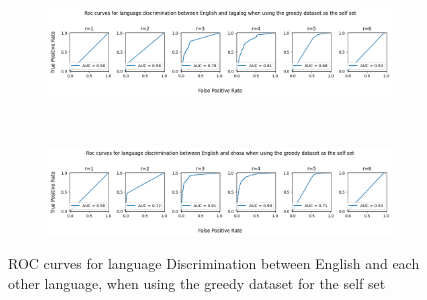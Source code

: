 \documentclass{article}
\begin{document}
\begin{figure}[ht]
\begin{subfigure}[t]{\linewidth}
        \label{fig:eng_mid_pla_grd}
    \end{subfigure}
    \\
    \begin{subfigure}[t]{\linewidth}
        \centering
        \includegraphics[width=\linewidth]{images/english_tagalog_greedy.png}
        \label{fig:eng_mid_tag_grd}
    \end{subfigure}
        \\
    \begin{subfigure}[t]{\linewidth}
        \centering
        \includegraphics[width=\linewidth]{images/english_xhosa_greedy.png}
        \label{fig:eng_xho_grd}
    \end{subfigure}
    
    \caption{ROC curves for language Discrimination between English and each other language, when using the greedy dataset for the self set}
    \label{fig:langs_greedy}
\end{figure}
\end{document}
